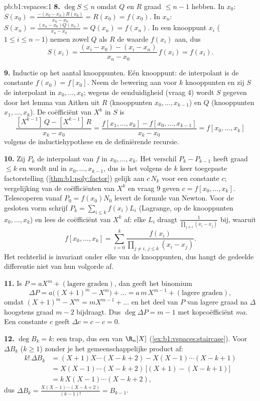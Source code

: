 \begin{solution}{pb:b1:vspaces:1}
\textbf{8.} $\deg S \leq n$ omdat $Q$ en $R$ graad $\leq n - 1$
hebben. In $x_0$: $S(x_0) = \frac{-(x_0 - x_n) R(x_0)}{x_n - x_0} =
R(x_0) = f(x_0)$. In $x_n$: $S(x_n) = \frac{(x_n - x_0)
Q(x_n)}{x_n - x_0} = Q(x_n) = f(x_n)$. In een  knooppunt
$x_i$ ($1 \leq i \leq n-1$) nemen zowel $Q$ als $R$ de waarde
$f(x_i)$ aan, dus
\[
S(x_i) = \frac{(x_i - x_0) - (x_i - x_n)}{x_n - x_0}\, f(x_i)
= f(x_i) .
\]

\textbf{9.} Inductie op het aantal knooppunten. Eén knooppunt: de
interpolant is de constante $f(x_0) = f[x_0]$. Neem de bewering
aan voor $k$ knooppunten en zij $S$ de interpolant in $x_0, \dots,
x_k$; wegens de eenduidigheid (vraag 4) wordt $S$ gegeven door het
lemma van Aitken uit $R$ (knooppunten $x_0, \dots, x_{k-1}$) en $Q$
(knooppunten $x_1, \dots, x_k$). De coëfficiënt van $X^{k}$ in $S$
is
\[
\frac{[X^{k-1}]\,Q - [X^{k-1}]\,R}{x_k - x_0}
= \frac{f[x_1, \dots, x_k] - f[x_0, \dots, x_{k-1}]}{x_k - x_0}
= f[x_0, \dots, x_k]
\]
volgens de inductiehypothese en de definiërende recursie.

\textbf{10.} Zij $P_k$ de interpolant van $f$ in $x_0, \dots, x_k$.
Het verschil $P_k - P_{k-1}$ heeft graad $\leq k$ en wordt nul in
$x_0, \dots, x_{k-1}$, dus is het volgens de $k$ keer toegepaste
factorstelling (\cref{thm:b1:poly:factor}) gelijk aan $c\,N_k$ voor
een constante $c$; vergelijking van de coëfficiënten van $X^{k}$ en
vraag 9 geven $c = f[x_0, \dots, x_k]$. Telescoperen vanaf $P_0 =
f(x_0) N_0$ levert de formule van Newton. Voor de gesloten vorm
schrijf $P_k = \sum_{i \leq k} f(x_i) L_i$ (Lagrange, op de
knooppunten $x_0, \dots, x_k$) en lees de coëfficiënt van $X^{k}$
af: elke $L_i$ draagt $\frac{1}{\prod_{j \neq i}(x_i - x_j)}$ bij,
waaruit
\[
f[x_0, \dots, x_k] = \sum_{i=0}^{k}
\frac{f(x_i)}{\prod_{j \neq i,\, j \leq k}(x_i - x_j)} .
\]
Het rechterlid is invariant onder elke  van de
knooppunten, dus hangt de gedeelde differentie niet van hun volgorde
af.

\textbf{11.} Is $P = a X^m + (\text{lagere graden})$, dan geeft het
binomium
\[
\Delta P = a\bigl((X+1)^m - X^m\bigr) + \dots
= a\,m\,X^{m-1} + (\text{lagere graden}),
\]
omdat $(X+1)^m - X^m = m X^{m-1} + \dots$ en het deel van $P$ van
lagere graad na $\Delta$ hoogstens graad $m - 2$ bijdraagt. Dus
$\deg \Delta P = m - 1$ met kopcoëfficiënt $m a$. Een constante $c$
geeft $\Delta c = c - c = 0$.

\textbf{12.} $\deg B_k = k$: een trap, dus een  van $\R_n[X]$
(\cref{ex:b1:vspaces:staircase}). Voor $\Delta B_k$ ($k \geq 1$)
zonder je het gemeenschappelijke product af:
\begin{align*}
k!\,\Delta B_k
&= (X+1)X\cdots(X-k+2) - X(X-1)\cdots(X-k+1) \\
&= X(X-1)\cdots(X-k+2)\,\bigl[(X+1) - (X-k+1)\bigr] \\
&= k\,X(X-1)\cdots(X-k+2),
\end{align*}
dus $\Delta B_k = \frac{X(X-1)\cdots(X-k+2)}{(k-1)!} = B_{k-1}$.


\end{solution}
